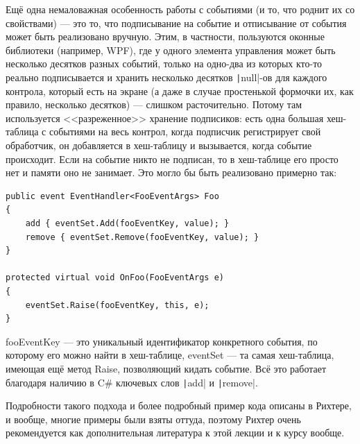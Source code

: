 \documentclass{../../text-style}
\begin{document}
Ещё одна немаловажная особенность работы с событиями (и то, что роднит их со свойствами) --- это то, что подписывание на событие и отписывание от события может быть реализовано вручную. Этим, в частности, пользуются оконные библиотеки (например, WPF), где у одного элемента управления может быть несколько десятков разных событий, только на одно-два из которых кто-то реально подписывается и хранить несколько десятков \texttt|null|-ов для каждого контрола, который есть на экране (а даже в случае простенькой формочки их, как правило, несколько десятков) --- слишком расточительно. Потому там используется <<разреженное>> хранение подписиков: есть одна большая хеш-таблица с событиями на весь контрол, когда подписчик регистрирует свой обработчик, он добавляется в хеш-таблицу и вызывается, когда событие происходит. Если на событие никто не подписан, то в хеш-таблице его просто нет и памяти оно не занимает. Это могло бы быть реализовано примерно так:

\begin{verbatim}
public event EventHandler<FooEventArgs> Foo 
{
    add { eventSet.Add(fooEventKey, value); }
    remove { eventSet.Remove(fooEventKey, value); }
}

protected virtual void OnFoo(FooEventArgs e) 
{
    eventSet.Raise(fooEventKey, this, e);
}
\end{verbatim}

fooEventKey --- это уникальный идентификатор конкретного события, по которому его можно найти в хеш-таблице, eventSet --- та самая хеш-таблица, имеющая ещё метод Raise, позволяющий кидать событие. Всё это работает благодаря наличию в C\# ключевых слов \texttt|add| и \texttt|remove|.

Подробности такого подхода и более подробный пример кода описаны в Рихтере, и вообще, многие примеры были взяты оттуда, поэтому Рихтер очень рекомендуется как дополнительная литература к этой лекции и к курсу вообще.
\end{document}
